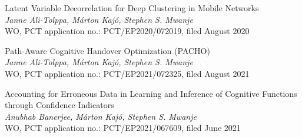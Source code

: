 			\begin{patent}
				Latent Variable Decorrelation for Deep Clustering in Mobile Networks \\
				\textit{Janne Ali-Tolppa, Márton Kajó, Stephen S. Mwanje} \\
				WO, PCT application no.: PCT/EP2020/072019, filed August 2020
			\end{patent}
			
			\begin{patent}
				Path-Aware Cognitive Handover Optimization (PACHO) \\
				\textit{Janne Ali-Tolppa, Márton Kajó, Stephen S. Mwanje} \\
				WO, PCT application no.: PCT/EP2021/072325, filed August 2021
			\end{patent}
			
			\begin{patent}
				Accounting for Erroneous Data in Learning and Inference of Cognitive Functions through Confidence Indicators \\
				\textit{Anubhab Banerjee, Márton Kajó, Stephen S. Mwanje} \\
				WO, PCT application no.: PCT/EP2021/067609, filed June 2021
			\end{patent}
		

